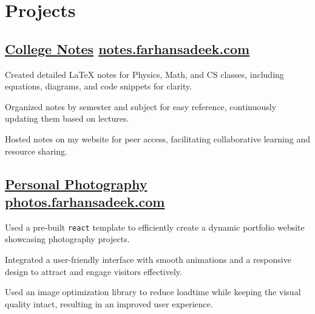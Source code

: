 \documentclass[]{Farhan_Resume_Class}
\begin{document}
\begin{minipage}[t]{0.70\textwidth}
    \section{Projects}
\subsection{\href{https://notes.farhansadeek.com}{College Notes} \hfill \href{https://notes.farhansadeek.com}{\lowercase{notes.farhansadeek.com}}}
        \begin{tightemize}
            \vspace{10pt}
            \item Created detailed LaTeX notes for Physics, Math, and CS classes, including equations, diagrams, and code snippets for clarity.
            \item Organized notes by semester and subject for easy reference, continuously updating them based on lectures.
            \item Hosted notes on my website for peer access, facilitating collaborative learning and resource sharing.
        \end{tightemize}
    \subsection{\href{https://photos.farhansadeek.com}{Personal Photography} \hfill \href{https://photos.farhansadeek.com}{\lowercase{photos.farhansadeek.com}}}
    \begin{tightemize}
        \vspace{10pt}
        \item Used a pre-built \texttt{react} template to efficiently create a dynamic portfolio website showcasing photography projects. 
\item Integrated a user-friendly interface with smooth animations and a responsive design to attract and engage visitors effectively. 
\item Used an image optimization library to reduce loadtime while keeping the visual quality intact, resulting in an improved user experience. 
    \end{tightemize}


\end{minipage}
\end{document}
